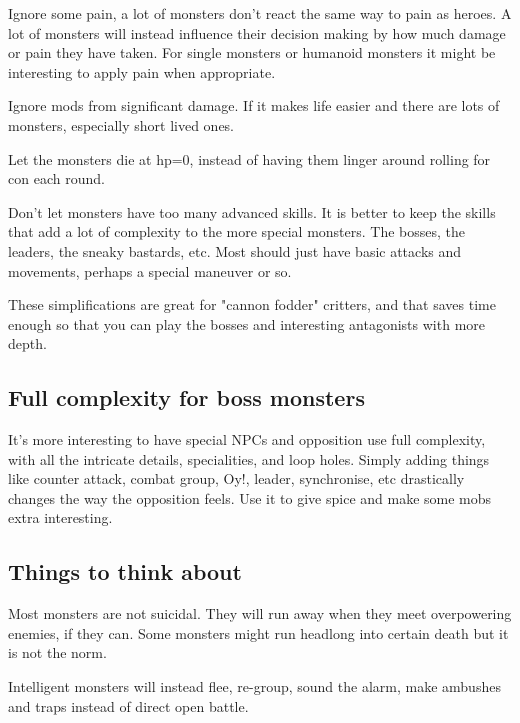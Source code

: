 Ignore some pain, a lot of monsters don't react the same way to pain as heroes. A lot of monsters will instead influence their decision making by how much damage or pain they have taken. For single monsters or humanoid monsters it might be interesting to apply pain when appropriate.

Ignore mods from significant damage. If it makes life easier and there are lots of monsters, especially short lived ones.

Let the monsters die at hp=0, instead of having them linger around rolling for con each round.

Don't let monsters have too many advanced skills. It is better to keep the skills that add a lot of complexity to the more special monsters. The bosses, the leaders, the sneaky bastards, etc. Most should just have basic attacks and movements, perhaps a special maneuver or so.

These simplifications are great for "cannon fodder" critters, and that saves time enough so that you can play the bosses and interesting antagonists with more depth.


\subsection*{Full complexity for boss monsters}
It's more interesting to have special NPCs and opposition use full complexity, with all the intricate details, specialities, and loop holes. Simply adding things like counter attack, combat group, Oy!, leader, synchronise, etc drastically changes the way the opposition feels. Use it to give spice and make some mobs extra interesting.


\subsection*{Things to think about}
Most monsters are not suicidal. They will run away when they meet overpowering enemies, if they can. Some monsters might run headlong into certain death but it is not the norm.

Intelligent monsters will instead flee, re-group, sound the alarm, make ambushes and traps instead of direct open battle.














